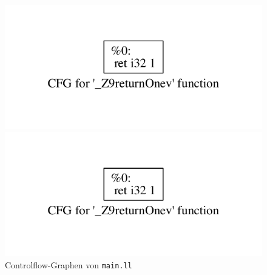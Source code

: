 \begin{figure}[H]
\begin{minipage}{.4\textwidth}
\centering
\includegraphics[scale=.8,page=1]{../Resources/Bilder/main_cfg.pdf}
\end{minipage}
\begin{minipage}{.5\textwidth}
\centering
\includegraphics[scale=.8,page=2]{../Resources/Bilder/main_cfg.pdf}
\end{minipage}
\caption{Controlflow-Graphen von \texttt{main.ll}}
\label{fig:main-cfg}
\end{figure}

